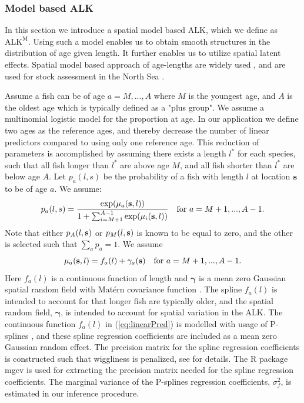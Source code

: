 \documentclass[a4paper 12pt]{article}
\numberwithin{equation}{section}
\begin{document}
\subsubsection{Model based ALK}
\label{sec:spatialModelALK}
In this section we introduce a spatial model based ALK, which we define as $\mathrm{ALK^M}$. Using such a model enables us to obtain smooth structures in the distribution of age given length. It further enables us to utilize spatial latent effects. Spatial model based approach of age-lengths are widely used \citep{berg2012spatial, hirst2012bayesian, rindorf2001analyses}, and are used for stock assessment in the North Sea \citep{berg2014evaluation}.  %

Assume a fish can be of age $a = M,...,A$ where $M$ is the youngest age, and $A$ is the oldest age which is typically defined as a "plus group". We assume a multinomial logistic model for the proportion at age. In our application we define two ages as the reference ages, and thereby decrease the number of linear predictors compared to using only one reference age. This reduction of parameters is accomplished by assuming there exists a length $l^*$ for each species, such that all fish longer than $l^*$ are above age $M$, and all fish shorter than $l^*$ are below age $A$. Let $p_a(l,s)$ be the probability of a fish with length $l$ at location ${\bf s}$ to be of age $a$. We assume:
\begin{equation}
p_a(l,s) = \frac{\exp(\mu_a({\bf s},l))}{1+ \sum_{i = M+1}^{A-1} \exp(\mu_i({\bf s},l))} \vspace{ 4mm} \ \ \ \text{for } a =M+1,...,A-1.
\end{equation}
Note that either $p_{A}(l,{\bf s})$ or $p_{M}(l,{\bf s})$ is known to be equal to zero, and the other is selected such that $\sum_a p_a = 1$. We assume
\begin{equation}\label{eq:linearPred}
\mu_a({\bf s},l) = f_a(l) + \gamma_a({\bf s}) \vspace{ 4mm} \ \ \ \text{for } a =M+1,...,A-1.
\end{equation}
Here $ f_a(l)$ is a continuous function of length and $\pmb{\gamma}$ is a mean zero Gaussian spatial random field with Mat\'{e}rn covariance function \citep{stein2012interpolation}. The spline $f_a (l)$ is intended to account for that longer fish are typically older, and the spatial random field, $\pmb{\gamma}$, is intended to account for spatial variation in the ALK. The continuous function $f_a(l)$ in (\ref{eq:linearPred}) is modelled with usage of P-splines \citep{wood2017generalized}, and these spline regression coefficients are included as a mean zero Gaussian random effect. The precision matrix for the spline regression coefficients is constructed such that wiggliness is penalized, see \citet[page 239]{wood2017generalized} for details. The R package mgcv \citep{wood2015package} is used for extracting the precision matrix needed for the spline regression coefficients. The marginal variance of the P-splines regression coefficients, $\sigma_f^2$, is estimated in our inference procedure.
\end{document}
